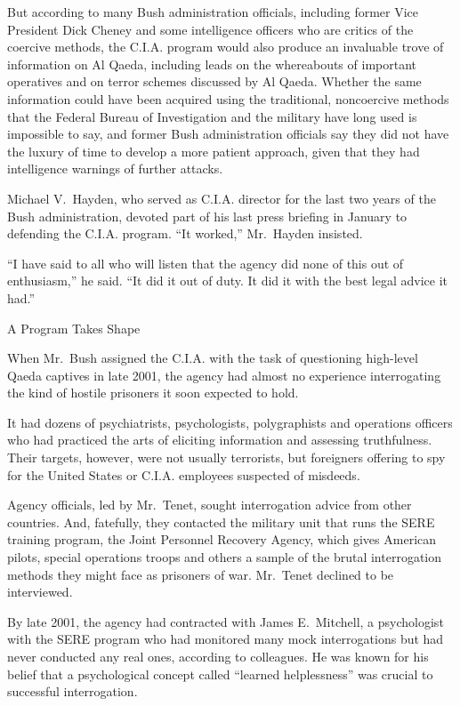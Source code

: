 \documentclass[12pt,a4paper,onecolumn]{article}
\begin{document}
But according to many Bush administration officials, including former Vice President Dick Cheney and
some intelligence officers who are critics of the coercive methods, the C.I.A. program would also
produce an invaluable trove of information on Al Qaeda, including leads on the whereabouts of
important operatives and on terror schemes discussed by Al Qaeda. Whether the same information could
have been acquired using the traditional, noncoercive methods that the Federal Bureau of
Investigation and the military have long used is impossible to say, and former Bush administration
officials say they did not have the luxury of time to develop a more patient approach, given that
they had intelligence warnings of further attacks.

Michael V.~Hayden, who served as C.I.A. director for the last two years of the Bush administration,
devoted part of his last press briefing in January to defending the C.I.A. program. ``It worked,''
Mr.~Hayden insisted.

``I have said to all who will listen that the agency did none of this out of enthusiasm,'' he said.
``It did it out of duty. It did it with the best legal advice it had.''

A Program Takes Shape

When Mr.~Bush assigned the C.I.A. with the task of questioning high-level Qaeda captives in late
2001, the agency had almost no experience interrogating the kind of hostile prisoners it soon
expected to hold.

It had dozens of psychiatrists, psychologists, polygraphists and operations officers who had
practiced the arts of eliciting information and assessing truthfulness. Their targets, however, were
not usually terrorists, but foreigners offering to spy for the United States or C.I.A. employees
suspected of misdeeds.

Agency officials, led by Mr.~Tenet, sought interrogation advice from other countries. And,
fatefully, they contacted the military unit that runs the SERE training program, the Joint Personnel
Recovery Agency, which gives American pilots, special operations troops and others a sample of the
brutal interrogation methods they might face as prisoners of war. Mr.~Tenet declined to be
interviewed.

By late 2001, the agency had contracted with James E.~Mitchell, a psychologist with the SERE program
who had monitored many mock interrogations but had never conducted any real ones, according to
colleagues. He was known for his belief that a psychological concept called ``learned helplessness''
was crucial to successful interrogation.
\end{document}
